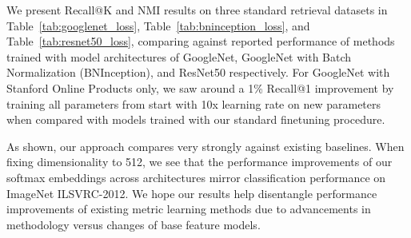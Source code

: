 \documentclass{bmvc2k}
\begin{document}
We present Recall@K and NMI results on three standard retrieval datasets in Table~\ref{tab:googlenet_loss}, Table~\ref{tab:bninception_loss}, and Table~\ref{tab:resnet50_loss}, comparing against reported performance of methods trained with model architectures of GoogleNet, GoogleNet with Batch Normalization (BNInception), and ResNet50 respectively. For GoogleNet with Stanford Online Products only, we saw around a 1\% Recall@1 improvement by training all parameters from start with 10x learning rate on new parameters when compared with models trained with our standard finetuning procedure.

As shown, our approach compares very strongly against existing baselines. When fixing dimensionality to 512, we see that the performance improvements of our softmax embeddings across architectures mirror classification performance on ImageNet ILSVRC-2012. We hope our results help disentangle performance improvements of existing metric learning methods due to advancements in methodology versus changes of base feature models.
\end{document}
